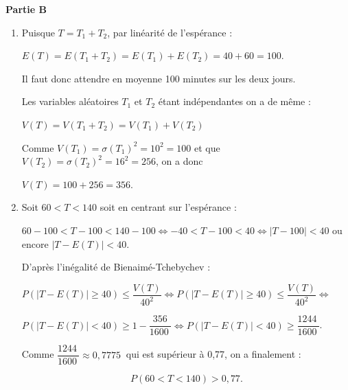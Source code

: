\documentclass[10pt]{article}
\providecommand{\np}[2][]{{#2~#1}}
\begin{document}
\medskip

\textbf{Partie B}

\begin{enumerate}
\item Puisque $T = T_1 + T_2$, par linéarité de l'espérance :

$E(T) = E(T_1 + T_2) = E(T_1) + E(T_2) = 40 + 60 = 100$.

Il faut donc attendre en moyenne 100 minutes sur les deux jours.

Les variables aléatoires $T_1$ et $T_2$ étant indépendantes on a de même :

$V(T) = V(T_1 + T_2) = V(T_1) + V(T_2)$

Comme $V(T_1) = \sigma(T_1)^2 = 10^2 = 100$ et que $V(T_2) = \sigma(T_2)^2 = 16^2 = 256$, on a donc 

$V(T) = 100 + 256 = 356$.
\item Soit $60 < T < 140$ soit en centrant sur l'espérance :

$60 - 100 < T - 100 < 140 - 100 \iff - 40 < T - 100 < 40 \iff |T - 100| < 40$ ou encore $|T - E(T)| < 40$.

D'après l'inégalité de Bienaimé-Tchebychev : 

$P(|T - E(T)| \geqslant 40) \leqslant \dfrac{V(T)}{40^2} \iff P(|T - E(T)| \geqslant 40) \leqslant \dfrac{V(T)}{40^2} \iff $

$P(|T - E(T)| < 40) \geqslant 1 - \dfrac{356}{\np{1600}} \iff P(|T - E(T)|  < 40) \geqslant \dfrac{\np{1244}}{\np{1600}}$.

Comme $\dfrac{\np{1244}}{\np{1600}} \approx \np{0,7775}$ qui est supérieur à 0,77, on a finalement :

\[P(60 < T < 140) > 0,77.\]

\end{enumerate}

\medskip
\end{document}
